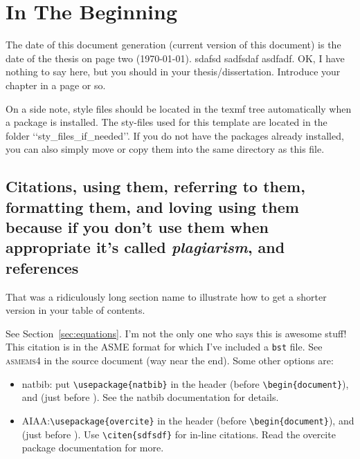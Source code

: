 \documentclass[12pt]{report}
\begin{document}
\chapter{In The Beginning}
The date of this document generation (current version of this document) is the date of the thesis on page two (\today).{}
sdafsd sadfsdaf asdfadf. OK, I have nothing to say here, but you should in your thesis/dissertation. Introduce your chapter in a page or so.

On a side note, style files should be located in the texmf tree automatically when a package is installed.  The sty-files used for this template are located in the folder \lq\lq{}sty\_files\_if\_needed\rq\rq{}.  If you do not have the packages already installed, you can also simply move or copy them into the same directory as this file.

\section[Citations/References (short form of section name)]{Citations, using them, referring to them, formatting them, and loving using them because if you don't use them when appropriate it's called \emph{plagiarism}, and references}
That was a ridiculously long section name to illustrate how to get a shorter version in your table of contents.

See Section~\ref{sec:equations}. I'm not the only one who says this is awesome stuff\cite{Mortara2004}!
This citation is in the ASME format for which I've included a \verb'bst'
file. See \textsc{asmems4} in the source document (way near the end). Some  other options are:
\begin{itemize}
\item natbib:  put \verb'\usepackage{natbib}' in the header (before \verb'\begin{document}'), and \verb'' (just before \verb'').  See the natbib documentation for details.
\item AIAA:\@put \verb'\usepackage{overcite}' in the header (before \verb'\begin{document}'), and \verb'' (just before \verb''). Use \verb'\citen{sdfsdf}' for in-line citations. Read the overcite package documentation for more.
\end{itemize}
\end{document}
